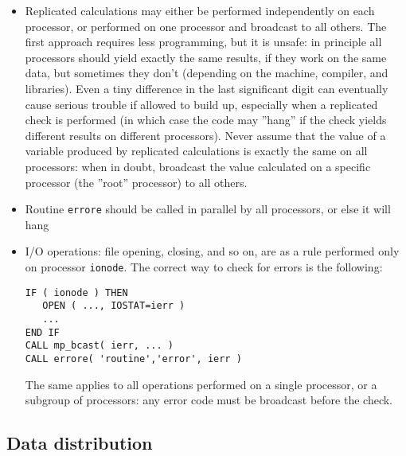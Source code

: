\documentclass[12pt,a4paper]{article}
\begin{document}
\begin{itemize}
\item
Replicated calculations may either be performed independently on 
each processor, or performed on one processor and broadcast to all
others. The first approach requires less programming, but it is unsafe:
in principle all processors should yield exactly the same results, if 
they work on the same data, but sometimes they don't (depending on the
machine, compiler, and libraries). Even a tiny difference in the last 
significant digit can eventually cause serious trouble if allowed to
 build up, especially when a replicated check is performed (in which
case the code may ''hang'' if the check yields different results on 
different processors). Never assume that the value of a variable produced 
by replicated calculations is exactly the same on all processors: when in 
doubt, broadcast the value calculated on a specific processor (the ''root'' 
processor) to all others.
\item
Routine \texttt{errore} should be called in parallel by all processors,
or else it will hang
\item
I/O operations: file opening, closing, and so on, are as a rule performed 
only on processor \texttt{ionode}. The correct way to check for errors is 
the following:
\begin{verbatim}
IF ( ionode ) THEN
   OPEN ( ..., IOSTAT=ierr )
   ...
END IF
CALL mp_bcast( ierr, ... )
CALL errore( 'routine','error', ierr )
\end{verbatim}
The same applies to all operations performed on a single processor,
or a subgroup of processors: any error code must be broadcast before
the check.
\end{itemize}

\subsection{ Data distribution}
\end{document}
